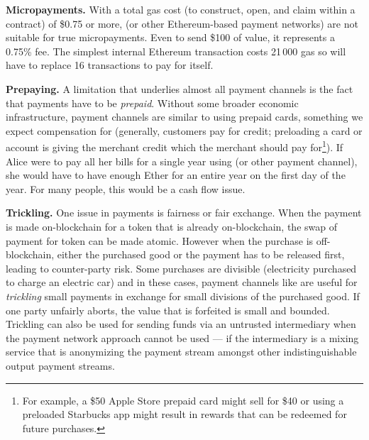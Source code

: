 \textbf{Micropayments.} With a total gas cost (to construct, open, and claim within a contract) of \$0.75 or more, \ew (or other Ethereum-based payment networks) are not suitable for true micropayments. Even to send \$100 of value, it represents a 0.75\% fee. The simplest internal Ethereum transaction costs 21\,000 gas so \ew will have to replace 16 transactions to pay for itself. 

\textbf{Prepaying.} A limitation that underlies almost all payment channels is the fact that payments have to be \textit{prepaid}. Without some broader economic infrastructure, payment channels are similar to using prepaid cards, something we expect compensation for (generally, customers pay for credit; preloading a card or account is giving the merchant credit which the merchant should pay for\footnote{For example, a \$50 Apple Store prepaid card might sell for \$40 or using a preloaded Starbucks app might result in rewards that can be redeemed for future purchases.}). If Alice were to pay all her bills for a single year using \ew (or other payment channel), she would have to have enough Ether for an entire year on the first day of the year. For many people, this would be a cash flow issue. 

\textbf{Trickling.} One issue in payments is fairness or fair exchange. When the payment is made on-blockchain for a token that is already on-blockchain, the swap of payment for token can be made atomic. However when the purchase is off-blockchain, either the purchased good or the payment has to be released first, leading to counter-party risk. Some purchases are divisible (\eg electricity purchased to charge an electric car) and in these cases, payment channels like \ew are useful for \textit{trickling} small payments in exchange for small divisions of the purchased good. If one party unfairly aborts, the value that is forfeited is small and bounded. Trickling can also be used for sending funds via an untrusted intermediary when the payment network approach cannot be used --- \eg if the intermediary is a mixing service that is anonymizing the payment stream amongst other indistinguishable output payment streams.


